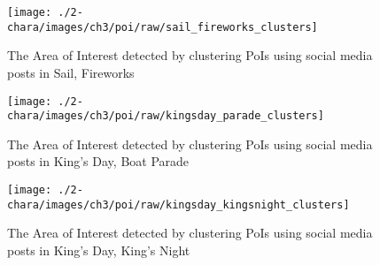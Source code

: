 \begin{figure*}[]
\centering
\texttt{[image: ./2-chara/images/ch3/poi/raw/sail\_fireworks\_clusters]}
\caption{The Area of Interest detected by clustering PoIs using social media posts in Sail, Fireworks}
\label{fig:apd_poi_sail_fireworks}
\end{figure*}

\begin{figure*}[]
\centering
\texttt{[image: ./2-chara/images/ch3/poi/raw/kingsday\_parade\_clusters]}
\caption{The Area of Interest detected by clustering PoIs using social media posts in King's Day, Boat Parade}
\label{fig:apd_poi_kingsday_parade}
\end{figure*}

\begin{figure*}[]
\centering
\texttt{[image: ./2-chara/images/ch3/poi/raw/kingsday\_kingsnight\_clusters]}
\caption{The Area of Interest detected by clustering PoIs using social media posts in King's Day, King's Night}
\label{fig:apd_poi_kingsday_night}
\end{figure*}